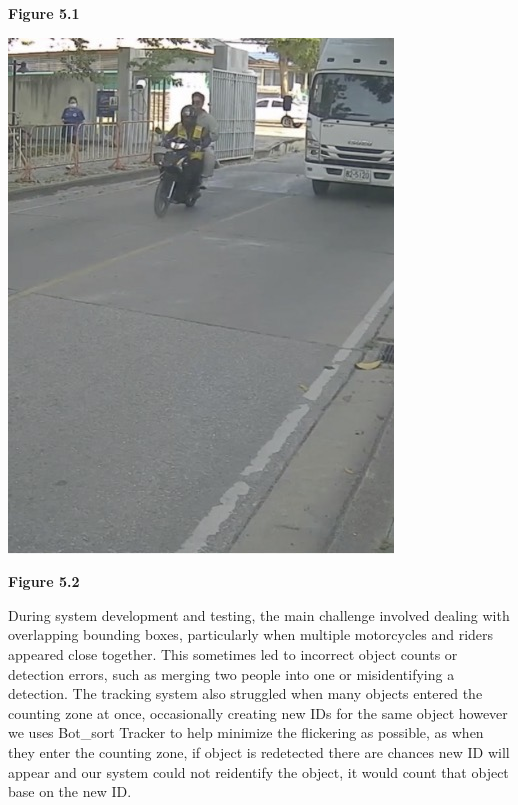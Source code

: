 \begin{center}
\begin{minipage}{0.45\textwidth}
		\textbf{Figure 5.1}
	\end{minipage}
	\hfill
	\begin{minipage}{0.45\textwidth}
		\centering
		\includegraphics[width=\linewidth]{limitation3.png}
		\vspace{0.5em} %
		
		\textbf{Figure 5.2}
	\end{minipage}
\end{center}
\setlength{\parindent}{2.5em}
During system development and testing, the main challenge involved dealing with overlapping bounding boxes, particularly when multiple motorcycles and riders appeared close together. This sometimes led to incorrect object counts or detection errors, such as merging two people into one or misidentifying a detection. The tracking system also struggled when many objects entered the counting zone at once, occasionally creating new IDs for the same object however we uses Bot\_sort Tracker to help minimize the flickering as possible, as when they enter the counting zone, if object is redetected there are chances new ID will appear and our system could not reidentify the object, it would count that object base on the new ID.


